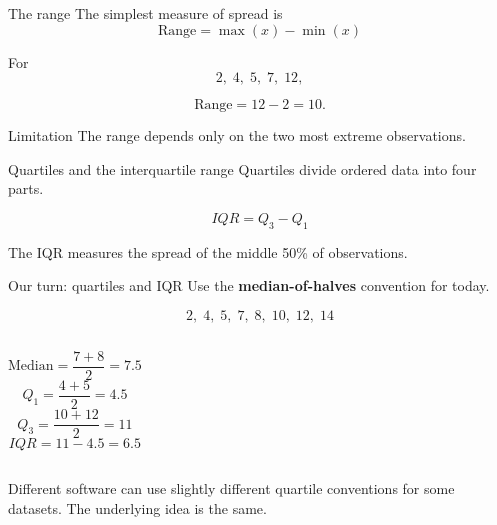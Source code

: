 \documentclass[11pt,aspectratio=169]{beamer}
\begin{document}
\begin{frame}{The range}
The simplest measure of spread is
\[
\boxed{\text{Range}=\max(x)-\min(x)}
\]

For
\[
2,\;4,\;5,\;7,\;12,
\]

\[
\text{Range}=12-2=10.
\]

\vfill
\begin{alertblock}{Limitation}
The range depends only on the two most extreme observations.
\end{alertblock}
\end{frame}

\begin{frame}{Quartiles and the interquartile range}
Quartiles divide ordered data into four parts.

\begin{center}
\end{center}

\[
\boxed{IQR=Q_3-Q_1}
\]

\vfill
\alert{The IQR measures the spread of the middle 50\% of observations.}
\end{frame}

\begin{frame}{Our turn: quartiles and IQR}
Use the \textbf{median-of-halves} convention for today.

\[
2,\;4,\;5,\;7,\;8,\;10,\;12,\;14
\]

\begin{columns}[T,onlytextwidth]
\[
\text{Median}=\frac{7+8}{2}=7.5
\]
\[
Q_1=\frac{4+5}{2}=4.5
\]
\[
Q_3=\frac{10+12}{2}=11
\]
\[
IQR=11-4.5=\boxed{6.5}
\]
\end{columns}

\vfill
\footnotesize Different software can use slightly different quartile conventions for some datasets. The underlying idea is the same.
\end{frame}
\end{document}
